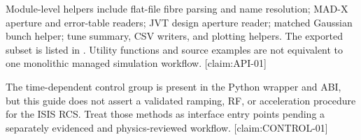 Module-level helpers include flat-file fibre parsing and name resolution; MAD-X aperture and error-table readers; JVT design aperture reader; matched Gaussian bunch helper; tune summary, CSV writers, and plotting helpers. The exported subset is listed in . Utility functions and source examples are not equivalent to one monolithic managed simulation workflow. [claim:API-01]

The time-dependent control group is present in the Python wrapper and ABI, but this guide does not assert a validated ramping, RF, or acceleration procedure for the ISIS RCS. Treat those methods as interface entry points pending a separately evidenced and physics-reviewed workflow. [claim:CONTROL-01]
